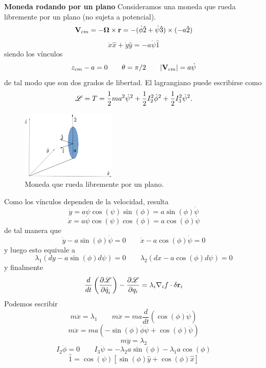\documentclass[10pt,oneside]{CBFT_article}
\begin{document}
\begin{ejemplillo}{\bf Moneda rodando por un plano}
Consideramos una moneda que rueda libremente por un plano (no sujeta a potencial).
\[
	\vb{V}_{cm} = -\vb{\Omega} \times \vb{r} =
	-(\dot{\phi}\hat{2} + \dot{\psi}\hat{3}) \times (-a\hat{2})
\]
\[
	\dot{x}\hat{x} + \dot{y}\hat{y} = -a \dot{\psi}\hat{1}
\]
siendo los vínculos
\[
	z_{cm} - a = 0 \qquad \theta=\pi/2 \qquad |\vb{V}_{cm}| = a\dot{\psi}
\]
de tal modo que son dos grados de libertad. El lagrangiano puede escribirse como 
\[
	\mathscr{L} = T = \frac{1}{2}m a^2 \dot{\psi}^2  + \frac{1}{2} I_2^2 \dot{\phi}^2 + \frac{1}{2} I_3^2\dot{\psi}^2.
\]

\begin{figure}
	\begin{center}
	\includegraphics[width=0.4\textwidth]{images/fig_moneda.pdf}	 
	\end{center}
	\caption{Moneda que rueda libremente por un plano.}
\end{figure} 

Como los vínculos dependen de la velocidad, resulta 
\[
\dot{y} = a\dot{\psi} \cos(\psi) \sin(\phi) = a \sin(\phi) \dot{\psi}
\]
\[
\dot{x} = a\dot{\psi} \cos(\psi) \cos(\phi) = a \cos(\phi) \dot{\psi}
\]
de tal manera que 
\[
	\dot{y} - a \sin(\phi) \dot{\psi} = 0 \qquad \dot{x} - a \cos(\phi) \dot{\psi} = 0
\]
y luego esto equivale a 
\[
	\lambda_1(dy - a \sin(\phi) d\psi) = 0 \qquad \lambda_2(dx - a \cos(\phi) d\psi)= 0
\]
y finalmente 
\[
	\frac{d}{dt}\left(\dpar{\Lag}{\dot{q}_i}\right) - \dpar{\Lag}{q_i} =
	\lambda_i \nabla_i f \cdot \delta \vb{r}_i
\]
Podemos escribir
\[
	m \ddot{x} = \lambda_1 \qquad m \ddot{x} = m a \frac{d}{dt}( \cos(\phi)\dot{\psi} )
\]
\[
	m \ddot{x} = m a ( -\sin(\phi)\dot{\phi}\dot{\psi} + \cos(\phi)\ddot{\psi} )
\]
\[
	m \ddot{y} = \lambda_2
\]
\[
	I_2\ddot{\phi} = 0 \qquad I_3\ddot{\psi} = - \lambda_2 a \sin(\phi) -\lambda_1 a \cos(\phi)
\]
\[
	\hat{1} = \cos(\psi)[\sin(\phi)\hat{y} + \cos(\phi)\hat{x}]
\]

\label{moneda}
\end{ejemplillo}



\end{document}
